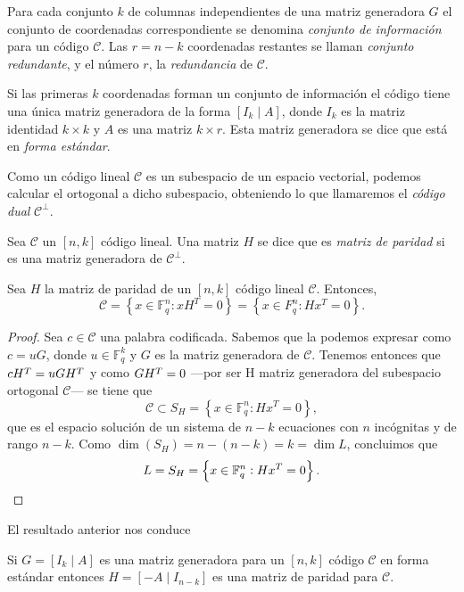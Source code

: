 \begin{definition}
  Para cada conjunto \(k\) de columnas independientes de una matriz generadora \(G\) el conjunto de coordenadas correspondiente se denomina \textit{conjunto de información} para un código \(\mathcal C\). Las \(r = n - k\) coordenadas restantes se llaman \textit{conjunto redundante}, y el número \(r\), la \textit{redundancia} de \(\mathcal C\).
\end{definition}

Si las primeras \(k\) coordenadas forman un conjunto de información el código tiene una única matriz generadora de la forma \([I_k \mid A]\), donde \(I_k\) es la matriz identidad \(k \times k\) y \(A\) es una matriz \(k \times r\). Esta matriz generadora se dice que está en \textit{forma estándar}.


Como un código lineal \(\mathcal C\) es un subespacio de un espacio vectorial, podemos calcular el ortogonal a dicho subespacio, obteniendo lo que llamaremos el \textit{código dual} \(\mathcal C^{\perp}\). 

\begin{definition}
  Sea \(\mathcal C\) un \([n, k]\) código lineal. Una matriz \(H\) se dice que es \textit{matriz de paridad} si es una matriz generadora de \(\mathcal C^{\perp}\).
\end{definition}

\begin{proposition}
  Sea \(H\) la matriz de paridad de un \([n, k]\) código lineal \(\mathcal C\). Entonces, \[\mathcal C = \left\{x \in \mathbb F_q^n : xH^T = 0\right\} = \left\{x \in F_q^n : Hx^T = 0\right\}.\]
\end{proposition}

\begin{proof}
  Sea \(c \in \mathcal C\) una palabra codificada. Sabemos que la podemos expresar como \(c = uG\), donde \(u \in \mathbb F_q^k\) y \(G\) es la matriz generadora de \(\mathcal C\). Tenemos entonces que \(c\cramped{H^T} = uG\cramped{H^T}\) y como \(G\cramped{H^T} = 0\) —por ser H matriz generadora del subespacio ortogonal \(\mathcal C\)— se tiene que \[\mathcal C \subset S_H = \left\{x \in \mathbb F_q^n : Hx^T = 0\right\},\] que es el espacio solución de un sistema de \(n - k\) ecuaciones con \(n\) incógnitas y de rango \(n - k\). Como \(\dim(S_H) = n - (n - k) = k = \dim L\), concluimos que \[L = S_H = \left\{x \in \mathbb F_q^n : Hx^T = 0\right\}.\qedhere\]
\end{proof}

El resultado anterior nos conduce 

\begin{theorem}
  Si \(G = [I_k \mid A]\) es una matriz generadora para un \([n, k]\) código \(\mathcal C\) en forma estándar entonces \(H = [-A \mid I_{n-k}]\) es una matriz de paridad para \(\mathcal C\).
\end{theorem}
